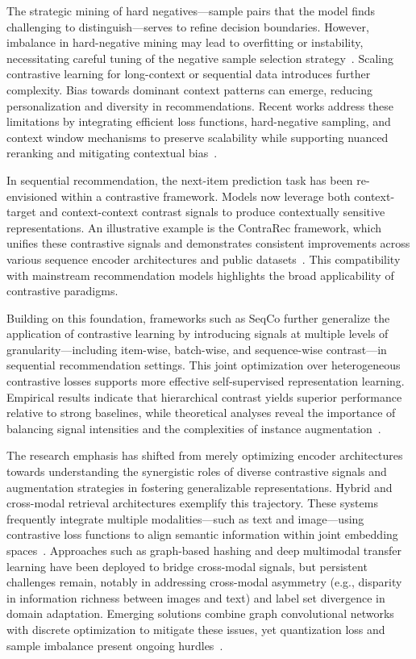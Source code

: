 \documentclass[sigconf]{acmart}
\begin{document}
The strategic mining of hard negatives—sample pairs that the model finds challenging to distinguish—serves to refine decision boundaries. However, imbalance in hard-negative mining may lead to overfitting or instability, necessitating careful tuning of the negative sample selection strategy~\cite{ref14,ref16,ref37}. Scaling contrastive learning for long-context or sequential data introduces further complexity. Bias towards dominant context patterns can emerge, reducing personalization and diversity in recommendations. Recent works address these limitations by integrating efficient loss functions, hard-negative sampling, and context window mechanisms to preserve scalability while supporting nuanced reranking and mitigating contextual bias~\cite{ref14,ref15,ref16,ref32,ref33,ref36,ref37,ref43,ref54,ref55}.

In sequential recommendation, the next-item prediction task has been re-envisioned within a contrastive framework. Models now leverage both context-target and context-context contrast signals to produce contextually sensitive representations. An illustrative example is the ContraRec framework, which unifies these contrastive signals and demonstrates consistent improvements across various sequence encoder architectures and public datasets~\cite{ref58}. This compatibility with mainstream recommendation models highlights the broad applicability of contrastive paradigms.

Building on this foundation, frameworks such as SeqCo further generalize the application of contrastive learning by introducing signals at multiple levels of granularity—including item-wise, batch-wise, and sequence-wise contrast—in sequential recommendation settings. This joint optimization over heterogeneous contrastive losses supports more effective self-supervised representation learning. Empirical results indicate that hierarchical contrast yields superior performance relative to strong baselines, while theoretical analyses reveal the importance of balancing signal intensities and the complexities of instance augmentation~\cite{ref59}.

The research emphasis has shifted from merely optimizing encoder architectures towards understanding the synergistic roles of diverse contrastive signals and augmentation strategies in fostering generalizable representations. Hybrid and cross-modal retrieval architectures exemplify this trajectory. These systems frequently integrate multiple modalities—such as text and image—using contrastive loss functions to align semantic information within joint embedding spaces~\cite{ref14,ref15,ref16,ref17,ref19,ref20,ref23,ref24,ref27,ref28,ref29,ref30,ref31,ref32,ref33,ref36,ref37,ref38,ref39,ref43,ref44,ref45,ref48,ref54,ref55,ref62}. Approaches such as graph-based hashing and deep multimodal transfer learning have been deployed to bridge cross-modal signals, but persistent challenges remain, notably in addressing cross-modal asymmetry (e.g., disparity in information richness between images and text) and label set divergence in domain adaptation. Emerging solutions combine graph convolutional networks with discrete optimization to mitigate these issues, yet quantization loss and sample imbalance present ongoing hurdles~\cite{ref17,ref19,ref29,ref38,ref45,ref54}.
\end{document}
